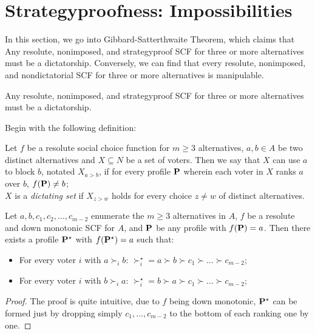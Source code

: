 \section{Strategyproofness: Impossibilities}

In this section, we go into Gibbard-Satterthwaite Theorem, which claims that Any resolute, nonimposed, and strategyproof SCF for three or more alternatives must be a dictatorship. Conversely, we can find that every resolute, nonimposed, and nondictatorial SCF for three or more alternatives is manipulable.

\begin{theorem}
    \label{GSTheorem}
    Any resolute, nonimposed, and strategyproof SCF for three or more alternatives must be a dictatorship.
\end{theorem}

Begin with the following definition:

\begin{definition}
    Let $f$ be a resolute social choice function for $m \geq 3$ alternatives, $a, b \in A$ be two distinct alternatives and $X \subseteq N$ be a set of voters. Then we say that $X$ can use $a$ to block $b$, notated $X_{a > b}$, if for every profile $\mathbf{P}$ wherein each voter in $X$ ranks $a$ over $b$, $f(\mathbf{P}) \neq b$; \\
    $X$ is a \emph{dictating set} if $X_{z>w}$ holds for every choice $z \neq w$ of distinct alternatives.
\end{definition}

\begin{lemma}
    \label{push_down_lemma}
    Let $a,b,c_1,c_2,\dots,c_{m-2}$ enumerate the $m \geq 3$ alternatives in $A$, $f$ be a resolute and down monotonic SCF for $A$, and $\mathbf{P}$ be any profile with $f(\mathbf{P}) = a$. Then there exists a profile $\mathbf{P}^\star$ with $f (\mathbf{P}^\star) = a$ such that:
    \begin{itemize}
        \item For every voter $i$ with $a \succ_i b$: $\succ^\star_i = a \succ b \succ c_1 \succ \dots \succ c_{m-2}$;
        \item For every voter $i$ with $b \succ_i a$: $\succ^\star_i = b \succ a \succ c_1 \succ \dots \succ c_{m-2}$;
    \end{itemize}
\end{lemma}

\begin{proof}
    The proof is quite intuitive, due to $f$ being down monotonic, $\mathbf{P}^\star$ can be formed just by dropping simply $c_1,\dots,c_{m-2}$ to the bottom of each ranking one by one. 
\end{proof}


